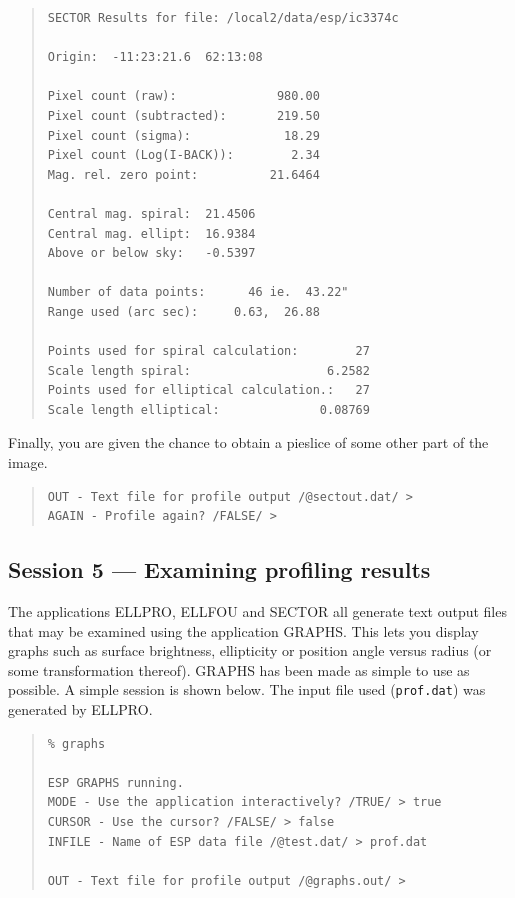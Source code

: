 \documentclass[twoside,11pt]{article}
\newcommand{\xlabel}[1]{}
\newenvironment{myquote}{\begin{quote}\begin{small}}{\end{small}\end{quote}}
\begin{document}
\begin{myquote}
\begin{verbatim}
SECTOR Results for file: /local2/data/esp/ic3374c

Origin:  -11:23:21.6  62:13:08

Pixel count (raw):              980.00
Pixel count (subtracted):       219.50
Pixel count (sigma):             18.29
Pixel count (Log(I-BACK)):        2.34
Mag. rel. zero point:          21.6464

Central mag. spiral:  21.4506
Central mag. ellipt:  16.9384
Above or below sky:   -0.5397

Number of data points:      46 ie.  43.22"
Range used (arc sec):     0.63,  26.88

Points used for spiral calculation:        27
Scale length spiral:                   6.2582
Points used for elliptical calculation.:   27
Scale length elliptical:              0.08769
\end{verbatim}
\end{myquote}

Finally, you are given the chance to obtain a pieslice of some other
part of the image.

\begin{myquote}
\begin{verbatim}
OUT - Text file for profile output /@sectout.dat/ >
AGAIN - Profile again? /FALSE/ >
\end{verbatim}
\end{myquote}


\subsection{Session 5 --- Examining profiling results}
\xlabel{SESSION5}

The applications ELLPRO, ELLFOU and SECTOR all generate text output
files that may be examined using the application GRAPHS. This lets
you display graphs such as surface brightness, ellipticity or position
angle versus radius (or some transformation thereof). GRAPHS
has been made as simple to use as possible. A simple session is shown below.
The input file used ({\tt prof.dat}) was generated by ELLPRO.

\begin{myquote}
\begin{verbatim}
% graphs

ESP GRAPHS running.
MODE - Use the application interactively? /TRUE/ > true
CURSOR - Use the cursor? /FALSE/ > false
INFILE - Name of ESP data file /@test.dat/ > prof.dat

OUT - Text file for profile output /@graphs.out/ >
\end{verbatim}
\end{myquote}
\end{document}
